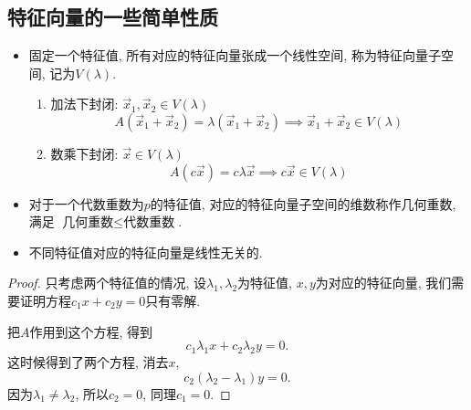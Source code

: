\subsection{特征向量的一些简单性质}
\begin{itemize}
    \item 固定一个特征值, 所有对应的特征向量张成一个线性空间, 称为特征向量子空间, 记为$V\left( \lambda \right) $.
    \begin{enumerate}
        \item 加法下封闭: $\vec{x}_1, \vec{x}_2 \in V\left( \lambda \right) $
        \begin{equation}
          A \left( \vec{x}_1 + \vec{x}_2  \right) = \lambda \left( \vec{x}_1 + \vec{x}_2 \right) \implies \vec{x}_1 + \vec{x}_2 \in V\left( \lambda \right)
        \end{equation}
        \item 数乘下封闭: $\vec{x} \in V\left( \lambda \right) $
        \begin{equation}
          A \left( c \vec{x} \right) = c \lambda \vec{x} \implies c \vec{x} \in V\left( \lambda \right)
        \end{equation}
    \end{enumerate}

    \item 对于一个代数重数为$p$的特征值, 对应的特征向量子空间的维数称作几何重数, 满足 $\text{几何重数} \le \text{代数重数}$.
    
    \item 不同特征值对应的特征向量是线性无关的.
\end{itemize}

\begin{proof}
    只考虑两个特征值的情况, 设$\lambda_1, \lambda_2$为特征值, $x,y$为对应的特征向量, 我们需要证明方程$c_1 x + c_2 y = 0$只有零解.

    把$A$作用到这个方程, 得到
    \begin{equation}
        c_1 \lambda_1 x + c_2 \lambda_2 y = 0.
    \end{equation}
    这时候得到了两个方程, 消去$x$,
    \begin{equation}
      c_2 \left( \lambda_2 - \lambda_1 \right) y = 0.
    \end{equation}
    因为$\lambda_1 \neq \lambda_2$, 所以$c_2 = 0$, 同理$c_1 = 0$.
\end{proof}
